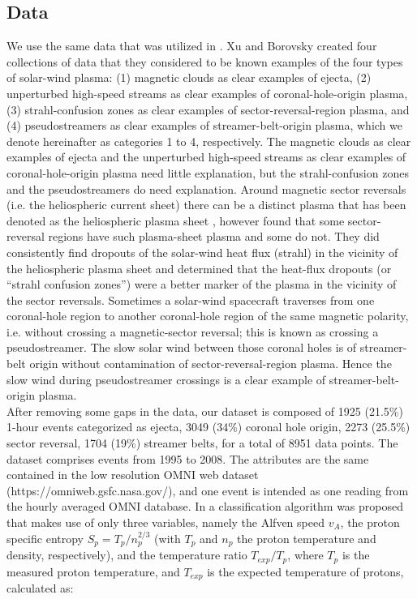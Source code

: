 \documentclass[draft,jgrga]{agutex}
\begin{document}
\begin{article}
\section{Data}\label{sec:data}
We use the same data that was utilized in \citet{xu2015}.
Xu and Borovsky created four collections of data that they considered to be known examples of the four types of solar-wind plasma: (1) magnetic clouds as clear examples of ejecta, (2) unperturbed high-speed streams as clear examples of coronal-hole-origin plasma, (3) strahl-confusion zones as clear examples of sector-reversal-region plasma, and (4) pseudostreamers as clear examples of streamer-belt-origin plasma, which we denote hereinafter as categories 1 to 4, respectively. 
{The magnetic clouds as clear examples of ejecta and the unperturbed high-speed streams as clear examples of coronal-hole-origin plasma need little explanation, but the strahl-confusion zones and the pseudostreamers do need explanation. Around magnetic sector reversals (i.e. the heliospheric current sheet) there can be a distinct plasma that has been denoted as the heliospheric plasma sheet \citep{winterhalter94}, however \citet{xu2015} found that some sector-reversal regions have such plasma-sheet plasma and some do not. They did consistently find dropouts of the solar-wind heat flux (strahl) in the vicinity of the heliospheric plasma sheet and determined that the heat-flux dropouts (or “strahl confusion zones”) were a better marker of the plasma in the vicinity of the sector reversals. Sometimes a solar-wind spacecraft traverses from one coronal-hole region to another coronal-hole region of the same magnetic polarity, i.e. without crossing a magnetic-sector reversal; this is known as crossing a pseudostreamer. The slow solar wind between those coronal holes is of streamer-belt origin without contamination of sector-reversal-region plasma. Hence the slow wind during pseudostreamer crossings is a clear example of streamer-belt-origin plasma.}\\
After removing some gaps in the data, our dataset is composed of 1925 {(21.5\%)} 1-hour events categorized as ejecta, 3049 {(34\%)} coronal hole origin, 2273 {(25.5\%)} sector reversal, 1704 {(19\%)} streamer belts, for a total of 8951 data points. The dataset comprises events from 1995 to 2008. The attributes are the same contained in the low resolution OMNI web dataset (https://omniweb.gsfc.nasa.gov/), and one event is intended as one reading from the hourly averaged OMNI database.
In \citet{xu2015} a classification algorithm was proposed that makes use of only three variables, namely the Alfven speed $v_A$, the proton specific entropy $S_p=T_p/n_p^{2/3}$ (with $T_p$ and $n_p$ the proton temperature and density, respectively), and the temperature ratio $T_{exp}/T_p$, where $T_p$ is the measured proton temperature, and $T_{exp}$ is the expected temperature of protons, calculated as:

\end{article}
\end{document}
